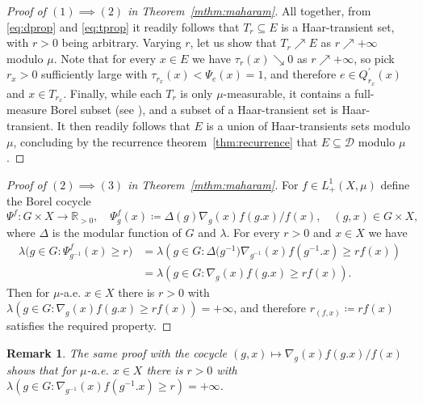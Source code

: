 \documentclass{amsart}
\numberwithin{equation}{subsection}
\newtheorem{rem}[thm]{Remark}
\begin{document}
\begin{proof}[Proof of \(\left(1\right)\implies\left(2\right)\) in Theorem~\ref{mthm:maharam}]
All together, from \eqref{eq:dprop} and \eqref{eq:tprop} it readily follows that \(T_{r}\subseteq E\) is a Haar-transient set, with \(r>0\) being arbitrary. Varying \(r\), let us show that \(T_{r}\nearrow E\) as \(r\nearrow+\infty\) modulo \(\mu\). Note that for every \(x\in E\) we have \(\tau_{r}\left(x\right)\searrow 0\) as \(r\nearrow+\infty\), so pick \(r_{x}>0\) sufficiently large with \(\tau_{r_{x}}\left(x\right)<\Psi_{e}\left(x\right)=1\), and therefore \(e\in Q_{r_{x}}^{\prime}\left(x\right)\) and \(x\in T_{r_{x}}\). Finally, while each \(T_{r}\) is only \(\mu\)-measurable, it contains a full-measure Borel subset (see \cite[Theorem (17.10)]{kechris2012descriptive}), and a subset of a Haar-transient set is Haar-transient. It then readily follows that \(E\) is a union of Haar-transients sets modulo \(\mu\), concluding by the recurrence theorem~\ref{thm:recurrence} that \(E\subseteq\mathcal{D}\) modulo \(\mu\).
\end{proof}

\begin{proof}[Proof of \(\left(2\right)\implies\left(3\right)\) in Theorem~\ref{mthm:maharam}]
For \(f\in L_{+}^{1}\left(X,\mu\right)\) define the Borel cocycle
\[\Psi^{f}:G\times X\to\mathbb{R}_{>0},\quad \Psi_{g}^{f}\left(x\right)\coloneqq\varDelta\left(g\right)\nabla_{g}\left(x\right)f\left(g.x\right)/f\left(x\right),\quad \left(g,x\right)\in G\times X,\]
where \(\varDelta\) is the modular function of \(G\) and \(\lambda\). For every \(r>0\) and \(x\in X\) we have
\begin{align*}
\lambda\big(g\in G:\Psi_{g^{-1}}^{f}\left(x\right)\geq r\big)
&=\lambda\left(g\in G:\varDelta\big(g^{-1}\big)\nabla_{g^{-1}}\left(x\right)f\left(g^{-1}.x\right)\geq rf\left(x\right)\right)\\
&=\lambda\left(g\in G:\nabla_{g}\left(x\right)f\left(g.x\right)\geq rf\left(x\right)\right).
\end{align*}
Then for \(\mu\)-a.e. \(x\in X\) there is \(r>0\) with \(\lambda\left(g\in G:\nabla_{g}\left(x\right)f\left(g.x\right)\geq rf\left(x\right)\right)=+\infty\), and therefore \(r_{\left(f,x\right)}\coloneqq rf\left(x\right)\) satisfies the required property.
\end{proof}

\begin{rem}
The same proof with the cocycle \(\left(g,x\right)\mapsto\nabla_{g}\left(x\right)f\left(g.x\right)/f\left(x\right)\) shows that for \(\mu\)-a.e. \(x\in X\) there is \(r>0\) with \(\lambda\left(g\in G:\nabla_{g^{-1}}\left(x\right)f\left(g^{-1}.x\right)\geq r\right)=+\infty\). 
\end{rem}
\end{document}
